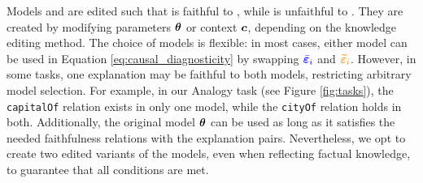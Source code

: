 Models \BModel{} and \OModel{} are edited such that  is faithful to \BModel{}, while  is unfaithful to \BModel{}. They are created by modifying parameters ${\bm{\theta}}$ or context ${\bm{c}}$, depending on the knowledge editing method.  The choice of models is flexible: in most cases, either model can be used in Equation \ref{eq:causal_diagnosticity} by swapping 
$\bepsilon{i}$ and $\oepsilon{i}$. However, in some tasks, one explanation may be faithful to both models, restricting arbitrary model selection. For example, in our Analogy task (see Figure \ref{fig:tasks}), the \texttt{capitalOf} relation exists in only one model, while the \texttt{cityOf} relation holds in both. Additionally, the original model ${\bm{\theta}}$ can be used as long as it satisfies the needed faithfulness relations with the explanation pairs. Nevertheless, we opt to create two edited variants of the models, even when reflecting factual knowledge, to guarantee that all conditions are met.